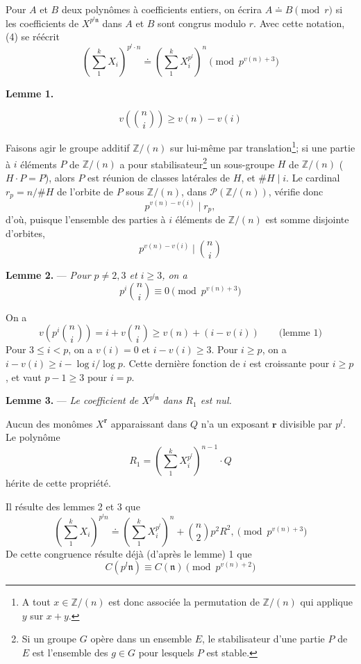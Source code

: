 \documentclass[10pt]{article}
\newcommand{\Z}{\mathbb Z}
\newcommand{\dd}{\mathrel{\doteq}}
\newcommand{\nn}{\mathfrak n}
\newcommand{\rr}{\mathbf r}
\begin{document}
Pour $A$ et $B$ deux polynômes à coefficients entiers, on écrira $A\dd B\pmod r$ si les coefficients de $X^{p^l\nn}$ dans $A$ et $B$ sont congrus modulo $r$. Avec cette notation, (4) se réécrit
\[
\left(\sum_{1}^k X_i\right)^{p^l\cdot n}
\dd
\left(\sum_{1}^k X_i^{p^l}\right)^n
\pmod {p^{v(n)+3}} \tag{8}
\]

\par\medskip\noindent\textbf{Lemme 1.}\par\nobreak\smallskip
\[
v\left(\binom ni\right) \ge v(n)-v(i) \tag{9}
\]

Faisons agir le groupe additif $\Z/(n)$ sur lui-même par translation\footnote{A tout $x\in\Z/(n)$ est donc associée la permutation de $\Z/(n)$ qui applique $y$ sur $x+y$.}; si une partie à $i$ éléments $P$ de $\Z/(n)$ a pour stabilisateur\footnote{Si un groupe $G$ opère dans un ensemble $E$, le stabilisateur d'une partie $P$ de $E$ est l'ensemble des $g\in G$ pour lesquels $P$ est stable.} un sous-groupe $H$ de $\Z/(n)$ ($H\cdot P=P$), alors $P$ est réunion de classes latérales de $H$, et $\#H\mid i$. Le cardinal $r_p=n/\#H$ de l'orbite de $P$ sous $\Z/(n)$, dans $\mathcal P(\Z/(n))$, vérifie donc
\[
p^{v(n)-v(i)}\mid r_p,
\]
d'où, puisque l'ensemble des parties à $i$ éléments de $\Z/(n)$ est somme disjointe d'orbites,
\[
p^{v(n)-v(i)}\mid\binom ni
\]

\par\medskip\noindent\textbf{Lemme 2.} --- \textit{Pour $p\ne2,3$ et $i\ge3$, on a}
\[
p^i\binom ni\equiv0\pmod {p^{v(n)+3}} \tag{10}
\]

On a
\[
v\left(p^i\binom ni\right)
=i+v\binom ni
\ge v(n)+(i-v(i))\qquad\text{(lemme 1)}
\]
Pour $3\le i<p$, on a $v(i)=0$ et $i-v(i)\ge3$. Pour $i\ge p$, on a $i-v(i)\ge i-\log i/\log p$. Cette dernière fonction de $i$ est croissante pour $i\ge p$, et vaut $p-1\ge3$ pour $i=p$.

\par\medskip\noindent\textbf{Lemme 3.} --- \textit{Le coefficient de $X^{p^l\nn}$ dans $R_1$ est nul.}

Aucun des monômes $X^\rr$ apparaissant dans $Q$ n'a un exposant $\rr$ divisible par $p^l$. Le polynôme
\[
R_1=\left(\sum_{1}^k X_i^{p^l}\right)^{n-1}\cdot Q
\]
hérite de cette propriété.

Il résulte des lemmes 2 et 3 que
\[
\left(\sum_{1}^k X_i\right)^{p^l n}
\dd
\left(\sum_{1}^k X_i^{p^l}\right)^n
+\binom n2 p^2R^2,
\pmod {p^{v(n)+3}} \tag{11}
\]
De cette congruence résulte déjà (d'après le lemme) 1 que
\[
C(p^l\nn)\equiv C(\nn)\pmod {p^{v(n)+2}} \tag{12}
\]
\end{document}
